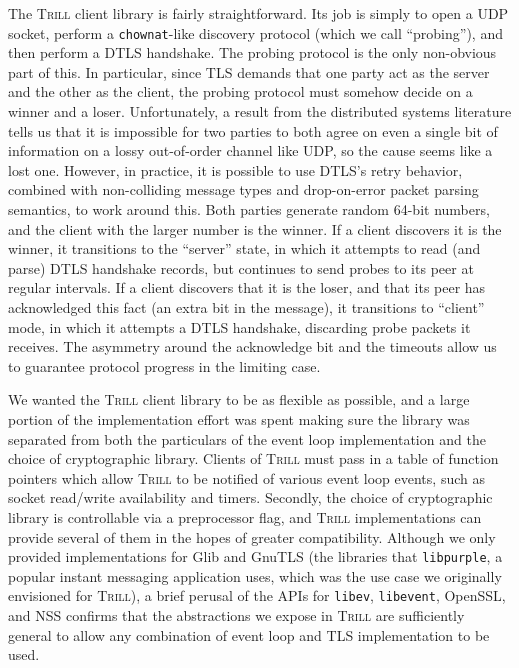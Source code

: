 \documentclass[11pt]{article}
\newcommand{\Trill}{\textsc{Trill}\xspace}
\begin{document}
The \Trill client library is fairly straightforward. Its job is simply to open a
UDP socket, perform a \verb`chownat`-like discovery protocol (which we call
``probing''), and then perform a DTLS handshake. The probing protocol is the
only non-obvious part of this. In particular, since TLS demands that one party
act as the server and the other as the client, the probing protocol must somehow
decide on a winner and a loser. Unfortunately, a result from the distributed
systems literature tells us that it is impossible for two parties to both agree
on even a single bit of information on a lossy out-of-order channel like UDP, so
the cause seems like a lost one. However, in practice, it is possible to use
DTLS's retry behavior, combined with non-colliding message types and
drop-on-error packet parsing semantics, to work around this. Both parties
generate random 64-bit numbers, and the client with the larger number is the
winner. If a client discovers it is the winner, it transitions to the ``server''
state, in which it attempts to read (and parse) DTLS handshake records, but
continues to send probes to its peer at regular intervals. If a client discovers
that it is the loser, and that its peer has acknowledged this fact (an extra bit
in the message), it transitions to ``client'' mode, in which it attempts a DTLS
handshake, discarding probe packets it receives. The asymmetry around the
acknowledge bit and the timeouts allow us to guarantee protocol progress in the
limiting case.

We wanted the \Trill client library to be as flexible as possible, and a large
portion of the implementation effort was spent making sure the library was
separated from both the particulars of the event loop implementation and the
choice of cryptographic library. Clients of \Trill must pass in a table of
function pointers which allow \Trill to be notified of various event loop
events, such as socket read/write availability and timers.  Secondly, the choice
of cryptographic library is controllable via a preprocessor flag, and \Trill
implementations can provide several of them in the hopes of greater
compatibility. Although we only provided implementations for Glib and GnuTLS
(the libraries that \verb`libpurple`, a popular instant messaging application
uses, which was the use case we originally envisioned for \Trill), a brief
perusal of the APIs for \verb`libev`, \verb`libevent`, OpenSSL, and NSS confirms
that the abstractions we expose in \Trill are sufficiently general to allow any
combination of event loop and TLS implementation to be used.
\end{document}
